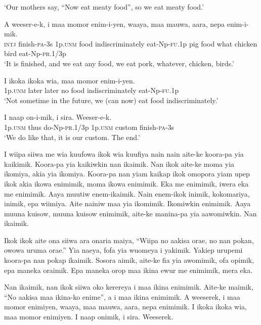 \glt ‘Our mothers say, “Now eat meaty food”, so we eat meaty food.’ \\
\z


\ea
\gll  A  weeser-e-k,  i  maa  momor  enim-i-yen,  waaya,                maa  mauwa,  aara,  nepa  enim-i-mik. \\
\textsc{intj}  finish-\textsc{pa}-3s  1p.\textsc{unm}  food  indiscriminately  eat-Np-\textsc{fu}.1p  pig   food  what  chicken  bird  eat-Np-\textsc{pr}.1/3p \\


\glt ‘It is finished, and we eat any food, we eat pork, whatever, chicken, birds.’ \\
\z


\ea
\gll  I  ikoka  ikoka  wia,  maa  momor  enim-i-yen. \\
1p.\textsc{unm}  later  later  no  food  indiscriminately  eat-Np-\textsc{fu}.1p \\
\glt ‘Not sometime in the future, we (can now) eat food indiscriminately.’ \\
\z


\ea
\gll  I  naap  on-i-mik,  i  sira.  Weeser-e-k. \\
1p.\textsc{unm}  thus  do-Np-\textsc{pr}.1/3p  1p.\textsc{unm}  custom  finish-\textsc{pa}-3s \\
\glt ‘We do like that, it is our custom. The end.’ \\
\z

I wiipa siiwa me wia kuufowa ikok wia kuufiya nain nain aite-ke koora-pa yia kaikimik. 
Koora-pa yia kaikiwkin  nan ikaimik. 
Nan ikok aite-ke moma yia ikomiya, akia yia ikomiya. 
Koora-pa nan yiam kaikap ikok omopora yiam upep ikok  akia ikowa enimimik,  moma ikowa enimimik. 
Eka me enimimik, iwera eka me enimimik. 
Aaya muutiw enem-ikaimik. 
Nain enem-ikok inimik, kokomariya, inimik, epa wiimiya. 
Aite nainiw maa yia ikomimik. 
Ikomiwkin enimimik. 
Aaya muuna kuisow, muuna kuisow enimimik, aite-ke manina-pa yia aawomiwkin. 
Nan ikaimik.

Ikok ikok aite ona siiwa ara onaria maiya, “Wiipa no aakisa orae, no nan pokan, owowa uruma orae.”
Yia naeya, fofa yia wuomeya i yakimik. 
Yakiep urupemi koora-pa nan pokap ikaimik. 
Sosora aimik, aite-ke fia yia awomimik, ofa opimik, epa maneka oraimik. 
Epa maneka orop maa ikina ewur me enimimik, mera eka.

Nan ikaimik, nan ikok siiwa oko kerereya i maa ikina enimimik. 
Aite-ke maimik, “No aakisa maa ikina-ko enime”, a i maa ikina enimimik. 
A weeserek, i maa momor enimiyen, waaya, maa mauwa, aara, nepa enimimik. 
I ikoka ikoka wia, maa momor enimiyen. 
I naap onimik, i sira. Weeserek. 


